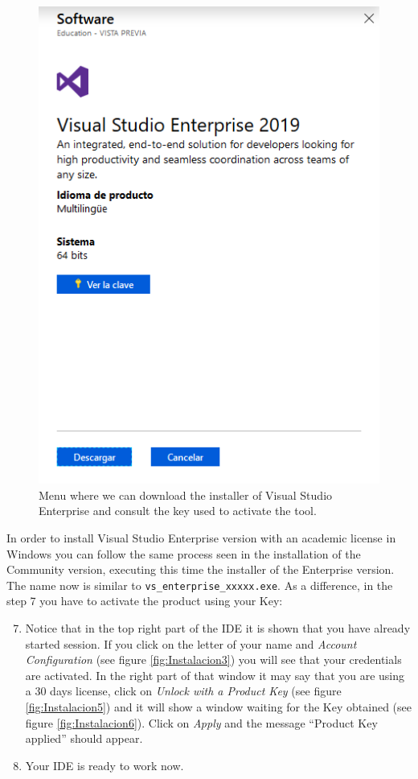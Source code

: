 \begin{figure}
    \centering
    \includegraphics[width= 0.6 \textwidth]{Figures/ExtraE}
    \caption{Menu where we can download the installer of Visual Studio Enterprise and consult the key used to activate the tool.}
    \label{fig:ExtraE}
\end{figure}

In order to install Visual Studio Enterprise version with an academic license in Windows you can follow the same process seen in the installation of the Community version, executing this time the installer of the Enterprise version. The name now is similar to \texttt{vs\_enterprise\_xxxxx.exe}. As a difference, in the step 7 you have to activate the product using your Key:

\begin{enumerate}
    \setcounter{enumi}{6}
    \item Notice that in the top right part of the IDE it is shown that you have already started session. If you click on the letter of your name and \textit{Account Configuration} (see figure \ref{fig:Instalacion3}) you will see that your credentials are activated. In the right part of that window it may say that you are using a 30 days license, click on \textit{Unlock with a Product Key} (see figure \ref{fig:Instalacion5}) and it will show a window waiting for the Key obtained (see figure \ref{fig:Instalacion6}). Click on \textit{Apply} and the message ``Product Key applied'' should appear. 
    \item Your IDE is ready to work now. 
\end{enumerate}

